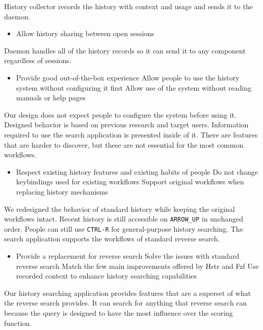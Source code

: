 History collector records the history with context and usage and sends it to the daemon.

\begin{itemize}
\item Allow history sharing between open sessions
\end{itemize}

Daemon handles all of the history records so it can send it to any component regardless of sessions.

\begin{itemize}
\item Provide good out-of-the-box experience 
\subitem Allow people to use the history system without configuring it first
\subitem Allow use of the system without reading manuals or help pages
\end{itemize}

Our design does not expect people to configure the system before using it. Designed behavior is based on previous research and target users. Information required to use the search application is presented inside of it. There are features that are harder to discover, but these are not essential for the most common workflows. 

\begin{itemize}
\item Respect existing history features and existing habits of people
\subitem Do not change keybindings used for existing workflows
\subitem Support original workflows when replacing history mechanisms
\end{itemize}

We redesigned the behavior of standard history while keeping the original workflows intact. Recent history is still accessible on \verb|ARROW_UP| in unchanged order. People can still use \verb|CTRL-R| for general-purpose history searching. 
The search application supports the workflows of standard reverse search.

\begin{itemize}
\item Provide a replacement for reverse search
\subitem Solve the issues with standard reverse search
\subitem Match the few main improvements offered by Hstr and Fzf
\subitem Use recorded context to enhance history searching capabilities
\end{itemize}

Our history searching application provides features that are a superset of what the reverse search provides. It can search for anything that reverse search can because the query is designed to have the most influence over the scoring function.

